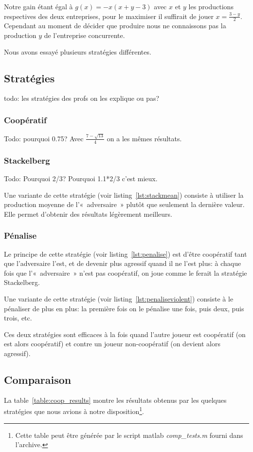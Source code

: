 \documentclass{scrartcl}
\begin{document}
  Notre gain étant égal à $g(x) = -x(x+y-3)$ avec $x$ et $y$ les productions
  respectives des deux entreprises, pour le maximiser il suffirait de jouer
  $x=\frac{3-y}{2}$. Cependant au moment de décider que produire nous ne
  connaissons pas la production $y$ de l'entreprise concurrente.

  Nous avons essayé plusieurs stratégies différentes.

  \subsection{Stratégies}
    todo: les stratégies des profs on les explique ou pas?
    \subsubsection{Coopératif}
    Todo: pourquoi 0.75? Avec $\frac{7-\sqrt{13}}{4}$ on a les mêmes résultats.

    \subsubsection{Stackelberg}
      Todo: Pourquoi 2/3? Pourquoi 1.1*2/3 c'est mieux.

      Une variante de cette stratégie (voir listing~\ref{lst:stackmean})
      consiste à utiliser la production moyenne de l'«~adversaire~» plutôt que
      seulement la dernière valeur. Elle permet d'obtenir des résultats
      légèrement meilleurs.

    \subsubsection{Pénalise}
      Le principe de cette stratégie (voir listing~\ref{lst:penalise}) est
      d'être coopératif tant que l'adversaire l'est, et de devenir plus
      agressif quand il ne l'est plus: à chaque fois que l'«~adversaire~» n'est
      pas coopératif, on joue comme le ferait la stratégie Stackelberg.

      Une variante de cette stratégie (voir listing~\ref{lst:penaliseviolent})
      consiste à le pénaliser de plus en plus: la première fois on le pénalise
      une fois, puis deux, puis trois, etc.

      Ces deux stratégies sont efficaces à la fois quand l'autre joueur est
      coopératif (on est alors coopératif) et contre un joueur non-coopératif
      (on devient alors agressif).

  \subsection{Comparaison}
    La table~\ref{table:coop_results} montre les résultats obtenus par les
    quelques stratégies que nous avions à notre disposition\footnote{Cette
    table peut être générée par le script matlab \textit{comp\_tests.m} fourni
    dans l'archive.}.
\end{document}
